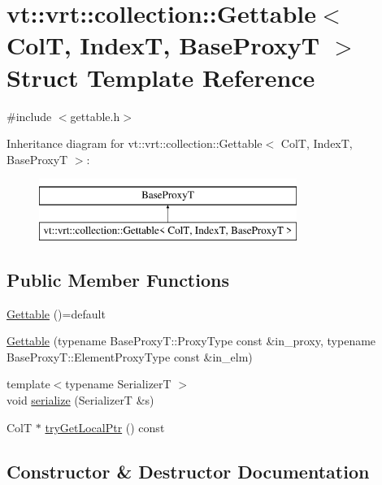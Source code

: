 \hypertarget{structvt_1_1vrt_1_1collection_1_1_gettable}{}\section{vt\+:\+:vrt\+:\+:collection\+:\+:Gettable$<$ ColT, IndexT, Base\+ProxyT $>$ Struct Template Reference}
\label{structvt_1_1vrt_1_1collection_1_1_gettable}


{\ttfamily \#include $<$gettable.\+h$>$}

Inheritance diagram for vt\+:\+:vrt\+:\+:collection\+:\+:Gettable$<$ ColT, IndexT, Base\+ProxyT $>$\+:\begin{figure}[H]
\begin{center}
\leavevmode
\includegraphics[height=2.000000cm]{structvt_1_1vrt_1_1collection_1_1_gettable}
\end{center}
\end{figure}
\subsection*{Public Member Functions}
\begin{DoxyCompactItemize}
\item 
\hyperlink{structvt_1_1vrt_1_1collection_1_1_gettable_a7d42291a5114749ec87f1ca1148efdad}{Gettable} ()=default
\item 
\hyperlink{structvt_1_1vrt_1_1collection_1_1_gettable_a20b5564b96f1e125fd0ae5b496cb47c9}{Gettable} (typename Base\+Proxy\+T\+::\+Proxy\+Type const \&in\+\_\+proxy, typename Base\+Proxy\+T\+::\+Element\+Proxy\+Type const \&in\+\_\+elm)
\item 
{\footnotesize template$<$typename SerializerT $>$ }\\void \hyperlink{structvt_1_1vrt_1_1collection_1_1_gettable_a0d35dc31fd50c0396f2fa0ba58f8f6ef}{serialize} (SerializerT \&s)
\item 
ColT $\ast$ \hyperlink{structvt_1_1vrt_1_1collection_1_1_gettable_ab75a8d5318324a48ceac30e01685a517}{try\+Get\+Local\+Ptr} () const
\end{DoxyCompactItemize}


\subsection{Constructor \& Destructor Documentation}
\mbox{\label{structvt_1_1vrt_1_1collection_1_1_gettable_a7d42291a5114749ec87f1ca1148efdad}} 
